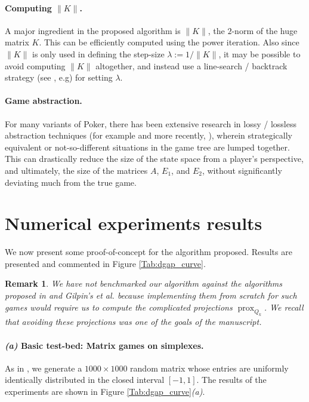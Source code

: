 \documentclass{article}
\DeclareMathOperator{\prox}{prox}
\newtheorem{remark}{Remark}
\begin{document}
\paragraph{Computing $\|K\|$.}
A major ingredient in the proposed algorithm is $\|K\|$, the $2$-norm
of the huge matrix $K$. This  can be efficiently computed using the
power iteration. Also since $\|K\|$ is only used in defining the
step-size $\lambda := 1/\|K\|$, it may be possible to avoid computing
$\|K\|$ altogether, and instead use a line-search / backtrack strategy
(see \cite{o2013adaptive}, e.g) for setting $\lambda$.

\paragraph{Game abstraction.} For many variants of Poker, there has
been extensive research in lossy / lossless abstraction techniques (for
example \cite{gilpin2007} and more recently,
\cite{sandholm2015abstraction,brown2015hierarchical}), wherein
strategically equivalent or not-so-different situations in the game
tree are lumped together. This can drastically reduce the size of the
state space from a player's perspective, and ultimately, the size of
the matrices $A$, $E_1$, and $E_2$, without significantly deviating
much from the true game.

\section{Numerical experiments results}
\label{sec:results}
We now present some proof-of-concept for the algorithm proposed.
Results are presented and commented in Figure \ref{Tab:dgap_curve}.
\begin{remark}
\label{thm:bulletproof}
We have not benchmarked our algorithm against the algorithms proposed in
\cite{nesterov2005a} and Gilpin's et al. \cite{gilpinfirst} because
implementing them from scratch for such games would require us to
compute the complicated projections $\prox_{Q_k}$. We recall that
avoiding these projections was one of the goals of the manuscript.
\end{remark}
\paragraph{\textit{(a)} Basic test-bed: Matrix games on simplexes.}
As in \cite{nesterov2005a,chambolle2014ergodic}, we generate a $1000
\times 1000$ random matrix whose entries are uniformly identically
distributed in the closed interval $[-1, 1]$. %
The results of the experiments are shown in Figure
\ref{Tab:dgap_curve}\textit{(a)}.
\end{document}
